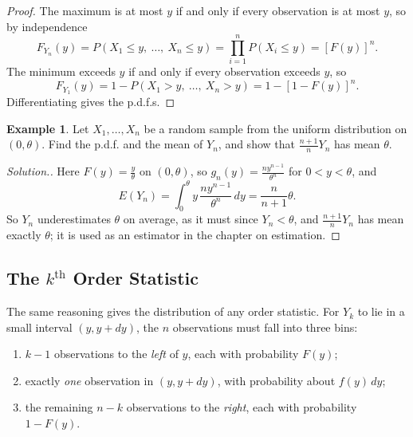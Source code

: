 \documentclass[12pt,a4paper]{report}
\theoremstyle{definition}
\newtheorem{example}[thm]{Example}
\theoremstyle{plain}
\newenvironment{solution}
  {\renewcommand{\qedsymbol}{}\begin{proof}[\textit{Solution}.]}
  {\end{proof}}
\begin{document}
\begin{proof}
The maximum is at most $y$ if and only if every observation is at most $y$, so
by independence
\[F_{Y_n}(y) = P(X_1 \leq y,\ \dots,\ X_n \leq y) = \prod^n_{i = 1}P(X_i\leq y)
= [F(y)]^n .\]
The minimum exceeds $y$ if and only if every observation exceeds $y$, so
\[F_{Y_1}(y) = 1 - P(X_1 > y,\ \dots,\ X_n > y) = 1 - [1 - F(y)]^n .\]
Differentiating gives the p.d.f.s.
\end{proof}

\begin{example}
\label{ex:uniformmax}
Let $X_1,\dots,X_n$ be a random sample from the uniform distribution on
$(0,\theta)$. Find the p.d.f. and the mean of $Y_n$, and show that
$\frac{n+1}{n}Y_n$ has mean $\theta$.
\end{example}

\begin{solution}
Here $F(y) = \frac{y}{\theta}$ on $(0,\theta)$, so $g_n(y) =
\frac{ny^{n-1}}{\theta^n}$ for $0<y<\theta$, and
\[E(Y_n) = \int_0^\theta y\,\frac{ny^{n-1}}{\theta^n}\,dy = \frac{n}{n +
1}\theta .\]
So $Y_n$ underestimates $\theta$ on average, as it must since $Y_n<\theta$, and
$\frac{n+1}{n}Y_n$ has mean exactly $\theta$; it is used as an estimator in the
chapter on estimation.
\end{solution}

\subsection{The $k^{\text{th}}$ Order Statistic}

The same reasoning gives the distribution of any order statistic. For $Y_k$ to
lie in a small interval $(y, y + dy)$, the $n$ observations must fall into three
bins:
\begin{enumerate}
\item $k-1$ observations to the \emph{left} of $y$, each with probability
$F(y)$;
\item exactly \emph{one} observation in $(y,y + dy)$, with probability about
$f(y)\,dy$;
\item the remaining $n-k$ observations to the \emph{right}, each with
probability $1-F(y)$.
\end{enumerate}
\end{document}
